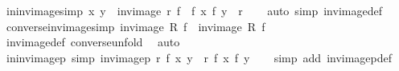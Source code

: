 \begin{isabellebody}
\endisatagproof
{\isafoldproof}%
%
\isadelimproof
\isanewline
%
\endisadelimproof
\isanewline
{}\isamarkupfalse%
\ in{\isacharunderscore}{\kern0pt}inv{\isacharunderscore}{\kern0pt}image{\isacharbrackleft}{\kern0pt}simp{\isacharbrackright}{\kern0pt}{\isacharcolon}{\kern0pt}\ {\isachardoublequoteopen}{\isacharparenleft}{\kern0pt}x{\isacharcomma}{\kern0pt}\ y{\isacharparenright}{\kern0pt}\ {\isasymin}\ inv{\isacharunderscore}{\kern0pt}image\ r\ f\ {\isasymlongleftrightarrow}\ {\isacharparenleft}{\kern0pt}f\ x{\isacharcomma}{\kern0pt}\ f\ y{\isacharparenright}{\kern0pt}\ {\isasymin}\ r{\isachardoublequoteclose}\isanewline
%
\isadelimproof
\ \ %
\endisadelimproof
%
\isatagproof
{}\isamarkupfalse%
\ {\isacharparenleft}{\kern0pt}auto\ simp{\isacharcolon}{\kern0pt}\ inv{\isacharunderscore}{\kern0pt}image{\isacharunderscore}{\kern0pt}def{\isacharparenright}{\kern0pt}%
\endisatagproof
{\isafoldproof}%
%
\isadelimproof
\isanewline
%
\endisadelimproof
\isanewline
{}\isamarkupfalse%
\ converse{\isacharunderscore}{\kern0pt}inv{\isacharunderscore}{\kern0pt}image{\isacharbrackleft}{\kern0pt}simp{\isacharbrackright}{\kern0pt}{\isacharcolon}{\kern0pt}\ {\isachardoublequoteopen}{\isacharparenleft}{\kern0pt}inv{\isacharunderscore}{\kern0pt}image\ R\ f{\isacharparenright}{\kern0pt}{\isasyminverse}\ {\isacharequal}{\kern0pt}\ inv{\isacharunderscore}{\kern0pt}image\ {\isacharparenleft}{\kern0pt}R{\isasyminverse}{\isacharparenright}{\kern0pt}\ f{\isachardoublequoteclose}\isanewline
%
\isadelimproof
\ \ %
\endisadelimproof
%
\isatagproof
{}\isamarkupfalse%
\ inv{\isacharunderscore}{\kern0pt}image{\isacharunderscore}{\kern0pt}def\ converse{\isacharunderscore}{\kern0pt}unfold\ \isamarkupfalse%
\ auto%
\endisatagproof
{\isafoldproof}%
%
\isadelimproof
\isanewline
%
\endisadelimproof
\isanewline
{}\isamarkupfalse%
\ in{\isacharunderscore}{\kern0pt}inv{\isacharunderscore}{\kern0pt}imagep\ {\isacharbrackleft}{\kern0pt}simp{\isacharbrackright}{\kern0pt}{\isacharcolon}{\kern0pt}\ {\isachardoublequoteopen}inv{\isacharunderscore}{\kern0pt}imagep\ r\ f\ x\ y\ {\isacharequal}{\kern0pt}\ r\ {\isacharparenleft}{\kern0pt}f\ x{\isacharparenright}{\kern0pt}\ {\isacharparenleft}{\kern0pt}f\ y{\isacharparenright}{\kern0pt}{\isachardoublequoteclose}\isanewline
%
\isadelimproof
\ \ %
\endisadelimproof
%
\isatagproof
{}\isamarkupfalse%
\ {\isacharparenleft}{\kern0pt}simp\ add{\isacharcolon}{\kern0pt}\ inv{\isacharunderscore}{\kern0pt}imagep{\isacharunderscore}{\kern0pt}def{\isacharparenright}{\kern0pt}%

\end{isabellebody}
